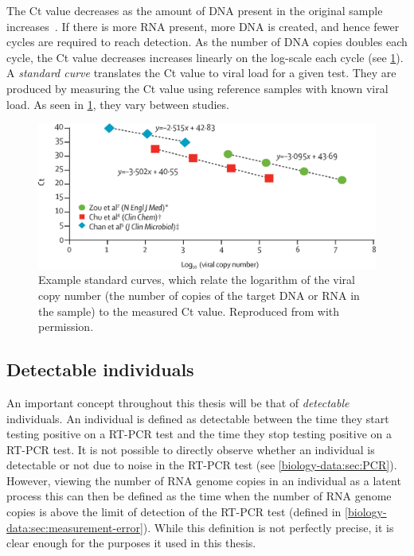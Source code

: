\documentclass[thesis.tex]{subfiles}
\begin{document}
The Ct value decreases as the amount of DNA present in the original sample increases~\autocite{hanRTPCR}.
If there is more RNA present, more DNA is created, and hence fewer cycles are required to reach detection.
As the number of DNA copies doubles each cycle, the Ct value decreases increases linearly on the log-scale each cycle (see \cref{biology-data:fig:ct-calibration}).
A \emph{standard curve} translates the Ct value to viral load for a given test.
They are produced by measuring the Ct value using reference samples with known viral load.
As seen in \cref{biology-data:fig:ct-calibration}, they vary between studies.
\begin{figure}
    \centering
    \includegraphics[width=\textwidth]{biology-data/ct-calibration}
    \caption[Example standard Ct curves]{%
        Example standard curves, which relate the logarithm of the viral copy number (the number of copies of the target DNA or RNA in the sample) to the measured Ct value.
        Reproduced from \textcite{hanRTPCR} with permission.
    }
    \label{biology-data:fig:ct-calibration}
\end{figure}

\subsection{Detectable individuals} \label{biology-data:sec:detectable}

An important concept throughout this thesis will be that of \emph{detectable} individuals.
An individual is defined as detectable between the time they start testing positive on a RT-PCR test and the time they stop testing positive on a RT-PCR test.
It is not possible to directly observe whether an individual is detectable or not due to noise in the RT-PCR test (see \cref{biology-data:sec:PCR}).
However, viewing the number of RNA genome copies in an individual as a latent process this can then be defined as the time when the number of RNA genome copies is above the limit of detection of the RT-PCR test (defined in \cref{biology-data:sec:measurement-error}).
While this definition is not perfectly precise, it is clear enough for the purposes it used in this thesis.
\end{document}
